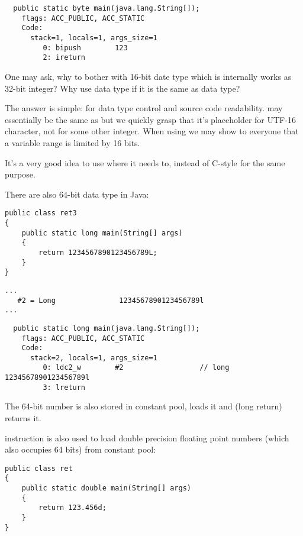 \begin{lstlisting}
  public static byte main(java.lang.String[]);
    flags: ACC_PUBLIC, ACC_STATIC
    Code:
      stack=1, locals=1, args_size=1
         0: bipush        123
         2: ireturn       
\end{lstlisting}

One may ask, why to bother with 16-bit  date type which is internally works
as 32-bit integer?
Why use  data type if it is the same as  data type?

The answer is simple: for data type control and source code readability.
 may essentially be the same as  but we quickly grasp that it's placeholder for
UTF-16 character, not for some other integer.
When using  we may show to everyone that a variable range is limited by 16 bits.

It's a very good idea to use  where it needs to, instead of C-style  for the same
purpose.

There are also 64-bit data type in Java:

\begin{lstlisting}
public class ret3
{
	public static long main(String[] args)
	{
		return 1234567890123456789L;
	}
}
\end{lstlisting}

\begin{lstlisting}[caption=Constant pool]
...
   #2 = Long               1234567890123456789l
...
\end{lstlisting}

\begin{lstlisting}
  public static long main(java.lang.String[]);
    flags: ACC_PUBLIC, ACC_STATIC
    Code:
      stack=2, locals=1, args_size=1
         0: ldc2_w        #2                  // long 1234567890123456789l
         3: lreturn       
\end{lstlisting}

The 64-bit number is also stored in constant pool,  loads it and  
(long return) returns it.

 instruction is also used to load double precision floating point numbers 
(which also occupies 64 bits) from constant pool:

\begin{lstlisting}
public class ret
{
	public static double main(String[] args)
	{
		return 123.456d;
	}
}
\end{lstlisting}

